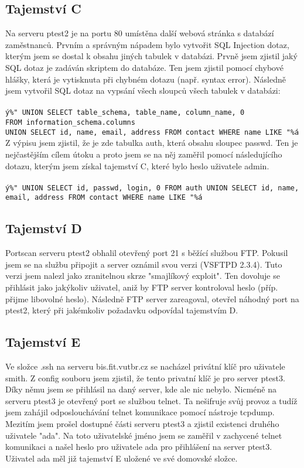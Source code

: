 \documentclass[11pt,a4paper]{article}
\begin{document}
\subsection{Tajemství C}

Na serveru ptest2 je na portu 80 umístěna další webová stránka s databází zaměstnanců. Prvním a správným nápadem bylo vytvořit SQL Injection dotaz, kterým jsem se dostal k obsahu jiných tabulek v databázi. Prvně jsem zjistil jaký SQL dotaz je zadáván skriptem do databáze. Ten jsem zjistil pomocí chybové hlášky, která je vytisknuta při chybném dotazu (např. syntax error). Následně jsem vytvořil SQL dotaz na vypsání všech sloupců všech tabulek v databázi: \\
\\
\texttt{ý\%"\  UNION SELECT table\_schema, table\_name, column\_name, 0 \\FROM information\_schema.columns \\UNION SELECT id, name, email, address FROM contact WHERE name LIKE "\%á}
\\

Z výpisu jsem zjistil, že je zde tabulka auth, která obsahu sloupec passwd. Ten je nejčastějším cílem útoku a proto jsem se na něj zaměřil pomocí následujícího dotazu, kterým jsem získal tajemství C, které bylo heslo uživatele admin.
\\
\\
\texttt{ý\%"\ UNION SELECT id, passwd, login, 0 FROM auth UNION SELECT id, name, email, address FROM contact WHERE name LIKE "\%á}

\subsection{Tajemství D}
Portscan serveru ptest2 obhalil otevřený port 21 s běžící službou FTP. Pokusil jsem se na službu připojit a server oznámil svou verzi (VSFTPD 2.3.4). Tuto verzi jsem nalezl jako zranitelnou skrze "smajlíkový exploit". Ten dovoluje se přihlásit jako jakýkoliv uživatel, aniž by FTP server kontroloval heslo (příp. přijme libovolné heslo). Následně FTP server zareagoval, otevřel náhodný port na ptest2, který při jakémkoliv požadavku odpovídal tajemstvím D.

\subsection{Tajemství E}

Ve složce .ssh na serveru bis.fit.vutbr.cz se nacházel privátní klíč pro uživatele smith. Z config souboru jsem zjistil, že tento privatní klíč je pro server ptest3. Díky němu jsem se přihlásil na daný server, kde ale nic nebylo. Nicméně na serveru ptest3 je otevřený port se službou telnet. Ta nešifruje svůj provoz a tudíž jsem zahájil odposlouchávání telnet komunikace pomocí nástroje tcpdump. Mezitím jsem prošel dostupné části serveru ptest3 a zjistil existenci druhého uživatele "ada". Na toto uživatelské jméno jsem se zaměřil v zachycené telnet komunikaci a našel heslo pro uživatele ada pro přihlášení na server ptest3. Uživatel ada měl již tajemství E uložené ve své domovské složce.
\end{document}
